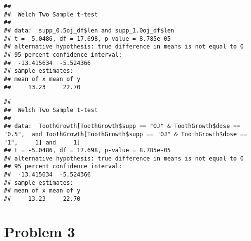 \documentclass[
]{article}
\newenvironment{Shaded}{\begin{snugshade}}{\end{snugshade}}
\newcommand{\CommentTok}[1]{\textcolor[rgb]{0.56,0.35,0.01}{\textit{#1}}}
\newcommand{\DataTypeTok}[1]{\textcolor[rgb]{0.13,0.29,0.53}{#1}}
\newcommand{\DecValTok}[1]{\textcolor[rgb]{0.00,0.00,0.81}{#1}}
\newcommand{\FloatTok}[1]{\textcolor[rgb]{0.00,0.00,0.81}{#1}}
\newcommand{\KeywordTok}[1]{\textcolor[rgb]{0.13,0.29,0.53}{\textbf{#1}}}
\newcommand{\NormalTok}[1]{#1}
\newcommand{\OperatorTok}[1]{\textcolor[rgb]{0.81,0.36,0.00}{\textbf{#1}}}
\newcommand{\OtherTok}[1]{\textcolor[rgb]{0.56,0.35,0.01}{#1}}
\newcommand{\StringTok}[1]{\textcolor[rgb]{0.31,0.60,0.02}{#1}}
\begin{document}
\begin{Shaded}
\end{Shaded}

\begin{verbatim}
## 
##  Welch Two Sample t-test
## 
## data:  supp_0.5oj_df$len and supp_1.0oj_df$len
## t = -5.0486, df = 17.698, p-value = 8.785e-05
## alternative hypothesis: true difference in means is not equal to 0
## 95 percent confidence interval:
##  -13.415634  -5.524366
## sample estimates:
## mean of x mean of y 
##     13.23     22.70
\end{verbatim}

\begin{Shaded}
\end{Shaded}

\begin{verbatim}
## 
##  Welch Two Sample t-test
## 
## data:  ToothGrowth[ToothGrowth$supp == "OJ" & ToothGrowth$dose == "0.5",  and ToothGrowth[ToothGrowth$supp == "OJ" & ToothGrowth$dose == "1",     1] and     1]
## t = -5.0486, df = 17.698, p-value = 8.785e-05
## alternative hypothesis: true difference in means is not equal to 0
## 95 percent confidence interval:
##  -13.415634  -5.524366
## sample estimates:
## mean of x mean of y 
##     13.23     22.70
\end{verbatim}

\hypertarget{problem-3}{%
\section{Problem 3}\label{problem-3}}
\end{document}

